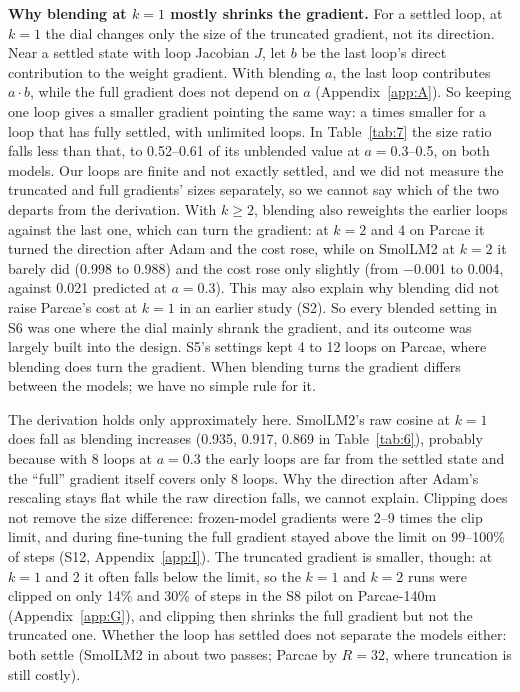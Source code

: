 \documentclass[10pt]{article}
\begin{document}
\textbf{Why blending at $k = 1$ mostly shrinks the gradient.} For a settled loop, at $k = 1$ the dial changes only the size of the truncated gradient, not its direction. Near a settled state with loop Jacobian $J$, let $b$ be the last loop's direct contribution to the weight gradient. With blending $a$, the last loop contributes $a\cdot b$, while the full gradient does not depend on $a$ (Appendix~\ref{app:A}). So keeping one loop gives a smaller gradient pointing the same way: a times smaller for a loop that has fully settled, with unlimited loops. In Table~\ref{tab:7} the size ratio falls less than that, to 0.52--0.61 of its unblended value at $a = 0.3$--0.5, on both models. Our loops are finite and not exactly settled, and we did not measure the truncated and full gradients' sizes separately, so we cannot say which of the two departs from the derivation. With $k \geq  2$, blending also reweights the earlier loops against the last one, which can turn the gradient: at $k = 2$ and 4 on Parcae it turned the direction after Adam and the cost rose, while on SmolLM2 at $k = 2$ it barely did (0.998 to 0.988) and the cost rose only slightly (from $-$0.001 to 0.004, against 0.021 predicted at $a = 0.3$). This may also explain why blending did not raise Parcae's cost at $k = 1$ in an earlier study (S2). So every blended setting in S6 was one where the dial mainly shrank the gradient, and its outcome was largely built into the design. S5's settings kept 4 to 12 loops on Parcae, where blending does turn the gradient. When blending turns the gradient differs between the models; we have no simple rule for it.

The derivation holds only approximately here. SmolLM2's raw cosine at $k = 1$ does fall as blending increases (0.935, 0.917, 0.869 in Table~\ref{tab:6}), probably because with 8 loops at $a = 0.3$ the early loops are far from the settled state and the ``full'' gradient itself covers only 8 loops. Why the direction after Adam's rescaling stays flat while the raw direction falls, we cannot explain. Clipping does not remove the size difference: frozen-model gradients were 2--9 times the clip limit, and during fine-tuning the full gradient stayed above the limit on 99--100\% of steps (S12, Appendix~\ref{app:I}). The truncated gradient is smaller, though: at $k = 1$ and 2 it often falls below the limit, so the $k = 1$ and $k = 2$ runs were clipped on only 14\% and 30\% of steps in the S8 pilot on Parcae-140m (Appendix~\ref{app:G}), and clipping then shrinks the full gradient but not the truncated one. Whether the loop has settled does not separate the models either: both settle (SmolLM2 in about two passes; Parcae by $R = 32$, where truncation is still costly).
\end{document}

